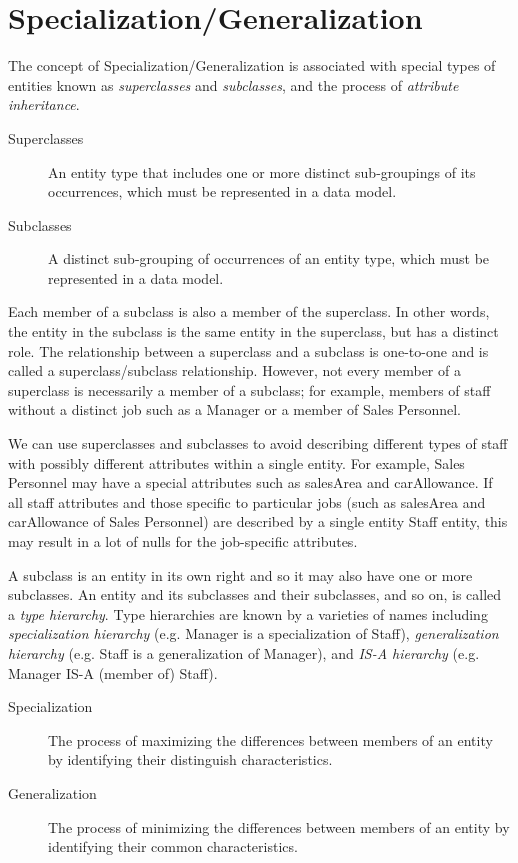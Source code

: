\documentclass[]{article}
\begin{document}
\section{Specialization/Generalization}
The concept of Specialization/Generalization is associated with special types of entities known as \emph{superclasses} and \emph{subclasses}, and the process of \emph{attribute inheritance}.
\begin{description}
\item[Superclasses] An entity type that includes one or more distinct sub-groupings of its occurrences, which must be represented in a data model.
\item[Subclasses] A distinct sub-grouping of occurrences of an entity type, which must be represented in a data model.
\end{description}
Each member of a subclass is also a member of the superclass. In other words, the entity in the subclass is the same entity in the superclass, but has a distinct role. The relationship between  a superclass and a subclass is one-to-one and is called a superclass/subclass relationship. However, not every member of a superclass is necessarily a member of a subclass; for example, members of staff without a distinct job such as a Manager or a member of Sales Personnel.\par 
We can use superclasses and subclasses to avoid describing different types of staff with possibly different attributes within a single entity. For example, Sales Personnel may have a special attributes such as salesArea and carAllowance. If all staff attributes and those specific to particular jobs (such as salesArea and carAllowance of Sales Personnel) are described by a single entity Staff entity, this may result in a lot of nulls for the job-specific attributes.\par 
A subclass is an entity in its own right and so it may also have one or more subclasses. An entity and its subclasses and their subclasses, and so on, is called a \emph{type hierarchy}. Type hierarchies are known by a varieties of names including \emph{specialization hierarchy} (e.g. Manager is a specialization of Staff), \emph{generalization hierarchy} (e.g. Staff is a generalization of Manager), and \emph{IS-A hierarchy} (e.g. Manager IS-A (member of) Staff).
\begin{description}
\item[Specialization]The process of maximizing the differences between members of an entity by identifying their distinguish characteristics.
\item[Generalization]The process of minimizing the differences between members of an entity by identifying their common characteristics.
\end{description}
\end{document}
